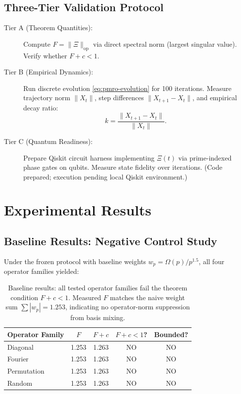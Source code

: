 \documentclass[11pt,a4paper]{article}
\begin{document}
\subsection{Three-Tier Validation Protocol}

\begin{description}
\item[Tier A (Theorem Quantities):] Compute \(F = \|\Xi\|_{\mathrm{op}}\) via direct spectral norm (largest singular value). Verify whether \(F + c < 1\).

\item[Tier B (Empirical Dynamics):] Run discrete evolution \eqref{eq:pmro-evolution} for 100 iterations. Measure trajectory norm \(\|X_t\|\), step differences \(\|X_{t+1} - X_t\|\), and empirical decay ratio:
\[
k = \frac{\|X_{t+1} - X_t\|}{\|X_t\|}.
\]

\item[Tier C (Quantum Readiness):] Prepare Qiskit circuit harness implementing \(\Xi(t)\) via prime-indexed phase gates on qubits. Measure state fidelity over iterations. (Code prepared; execution pending local Qiskit environment.)
\end{description}

\section{Experimental Results}

\subsection{Baseline Results: Negative Control Study}

Under the frozen protocol with baseline weights \(w_p = \Omega(p)/p^{1.5}\), all four operator families yielded:

\begin{table}[h]
\centering
\begin{tabular}{lcccc}
\toprule
\textbf{Operator Family} & \textbf{\(F\)} & \textbf{\(F+c\)} & \textbf{\(F+c < 1\)?} & \textbf{Bounded?} \\
\midrule
Diagonal & 1.253 & 1.263 & NO & NO \\
Fourier & 1.253 & 1.263 & NO & NO \\
Permutation & 1.253 & 1.263 & NO & NO \\
Random & 1.253 & 1.263 & NO & NO \\
\bottomrule
\end{tabular}
\caption{Baseline results: all tested operator families fail the theorem condition \(F+c<1\). Measured \(F\) matches the naive weight sum \(\sum |w_p| = 1.253\), indicating no operator-norm suppression from basis mixing.}
\label{tab:baseline-results}
\end{table}
\end{document}
